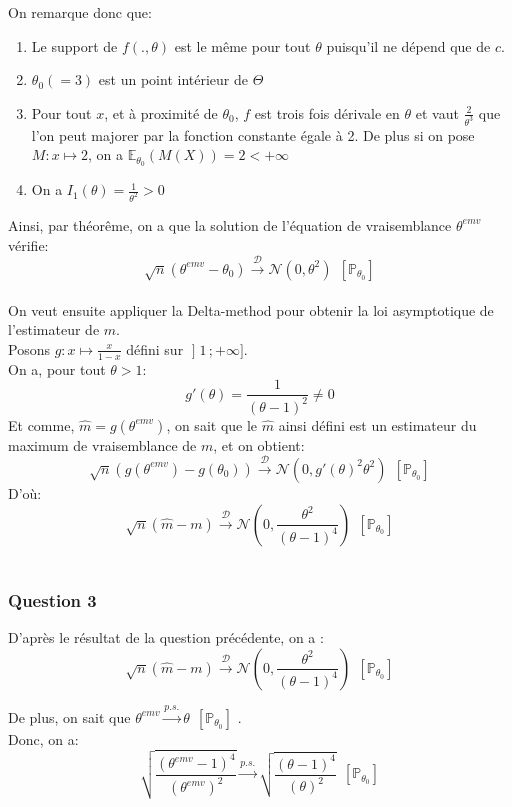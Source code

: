 \documentclass[a4paper,11pt]{article}
\theoremstyle{remark}
\begin{document}
On remarque donc que:
\begin{enumerate}
	\item Le support de $f(.,\theta)$ est le m\^eme pour tout $\theta$ puisqu'il ne d\' epend que de $c$.
	\item $\theta_{0} (=3)$ est un point int\'erieur de $\Theta$
	\item Pour tout $x$, et \`a proximit\'e de $\theta_{0}$, $f$ est trois fois d\'erivale en $\theta$ et vaut $\frac{2}{\theta^{3}}$ que l'on peut majorer par la fonction constante \' egale \`a 2. De plus si on pose $M:x\longmapsto 2$, on a $\mathbb{E}_{\theta_{0}}(M(X))=2<+\infty$
	\item On a $I_{1}(\theta)= \frac{1}{\theta^{2}}>0$
\end{enumerate}
Ainsi, par th\'eor\^eme, on a que la solution de  l'\'equation de vraisemblance $\theta^{emv}$ v\'erifie:
$$\sqrt{n}(\theta^{emv}-\theta_{0})\stackrel{\mathcal{D}}{\longrightarrow}\mathcal{N}(0,\theta^{2}) \ \  [\mathbb{P}_{\theta_{0}}]$$
\\
On veut ensuite appliquer la Delta-method pour obtenir la loi asymptotique de l'estimateur de $m$.
\\Posons $g:x \longmapsto \frac{x}{1-x}$ d\'efini sur $\mathopen{]}1\,;+\infty\mathclose{]}$.
\\ On a, pour tout $\theta>1$:
$$g'(\theta)=\frac{1}{(\theta-1)^{2}}\neq0$$
Et comme, $\hat{m}=g(\theta^{emv})$, on sait que le $\hat{m}$ ainsi défini est un estimateur du maximum de vraisemblance de $m$, et on obtient:
$$\sqrt{n}(g(\theta^{emv})-g(\theta_{0}))\stackrel{\mathcal{D}}{\longrightarrow}\mathcal{N}(0,g'(\theta)^{2}\theta^{2}) \ \  [\mathbb{P}_{\theta_{0}}]$$
D'o\`u:
$$\sqrt{n}(\hat{m}-m)\stackrel{\mathcal{D}}{\longrightarrow}\mathcal{N}(0,\frac{\theta^{2}}{(\theta-1)^{4}}) \ \  [\mathbb{P}_{\theta_{0}}]$$
\\
\subsubsection{Question 3}
D'apr\`es le r\'esultat de la question pr\'ec\'edente, on a :
$$\sqrt{n}(\hat{m}-m)\stackrel{\mathcal{D}}{\longrightarrow}\mathcal{N}(0,\frac{\theta^{2}}{(\theta-1)^{4}}) \ \  [\mathbb{P}_{\theta_{0}}]$$

		
De plus, on sait que $\theta^{emv}\stackrel{p.s.}{\longrightarrow}\theta\ \  [\mathbb{P}_{\theta_{0}}] $ .\\
Donc, on a: 
$$\sqrt{\frac{(\theta^{emv}-1)^{4}}{(\theta^{emv})^{2}}} \stackrel{p.s.}{\longrightarrow}  \sqrt{\frac{(\theta-1)^{4}}{(\theta)^{2}}}\ \  [\mathbb{P}_{\theta_{0}}] $$
\end{document}
